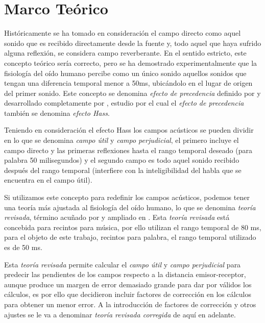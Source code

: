 
\chapter{Marco Teórico}
\label{marcoteorico}

Históricamente se ha tomado en consideración el campo directo como aquel sonido que es recibido directamente desde la fuente y, todo aquel que haya sufrido alguna reflexión, se considera campo reverberante. En el sentido estricto, este concepto teórico sería correcto, pero se ha demostrado experimentalmente que la fisiología del oído humano percibe como un único sonido aquellos sonidos que tengan una diferencia temporal menor a 50ms, ubicándolo en el lugar de origen del primer sonido. Este concepto se denomina \textit{efecto de precedencia} definido por \cite{Wallach1949} y desarrollado completamente por \cite{Haas1949}, estudio por el cual el \textit{efecto de precedencia} también se denomina \textit{efecto Hass}.

Teniendo en consideración el efecto Hass los campos acústicos se pueden dividir en lo que se denomina \textit{campo útil} y \textit{campo perjudicial}, el primero incluye el campo directo y las primeras reflexiones hasta el rango temporal deseado (para palabra 50 milisegundos) y el segundo campo es todo aquel sonido recibido después del rango temporal (interfiere con la inteligibilidad del habla que se encuentra en el campo útil).

Si utilizamos este concepto para redefinir los campos acústicos, podemos tener una teoría más ajustada al fisiología del oído humano, lo que se denomina \textit{teoría revisada}, término acuñado por \cite{Barron1988} y ampliado en \cite{Barron2015}. Esta \textit{teoría revisada} está concebida para recintos para música, por ello utilizan el rango temporal de 80 ms, para el objeto de este trabajo, recintos para palabra, el rango temporal utilizado es de 50 ms.

Esta \textit{teoría revisada} permite calcular el \textit{campo útil} y \textit{campo perjudicial} para predecir las pendientes de los campos respecto a la distancia emisor-receptor, aunque produce un margen de error demasiado grande para dar por válidos los cálculos, es por ello que \cite{Sato2008} decidieron incluir factores de corrección en los cálculos para obtener un menor error. A la introducción de factores de corrección y otros ajustes se le va a denominar \textit{teoría revisada corregida} de aquí en adelante.

